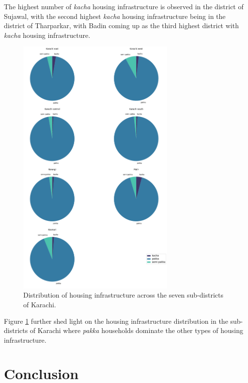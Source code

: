 \documentclass{article}
\begin{document}
\vspace{0.5cm}

\noindent The highest number of \textit{kacha} housing infrastructure is observed in the district of Sujawal, with the second highest \textit{kacha} housing infrastructure being in the district of Tharparkar, with Badin coming up as the third highest district with \textit{kacha} housing infrastructure.

\begin{figure}[H]
    \centering
    \includegraphics[width=0.7\textwidth]{../Figures/Figure07.png}
    \caption{Distribution of housing infrastructure across the seven sub-districts of Karachi.}
    \label{fig:fig6}
\end{figure}

\noindent Figure \ref{fig:fig6} further shed light on the housing infrastructure distribution in the sub-districts of Karachi where \textit{pakka} households dominate the other types of housing infrastructure.

\section*{Conclusion}
\end{document}
